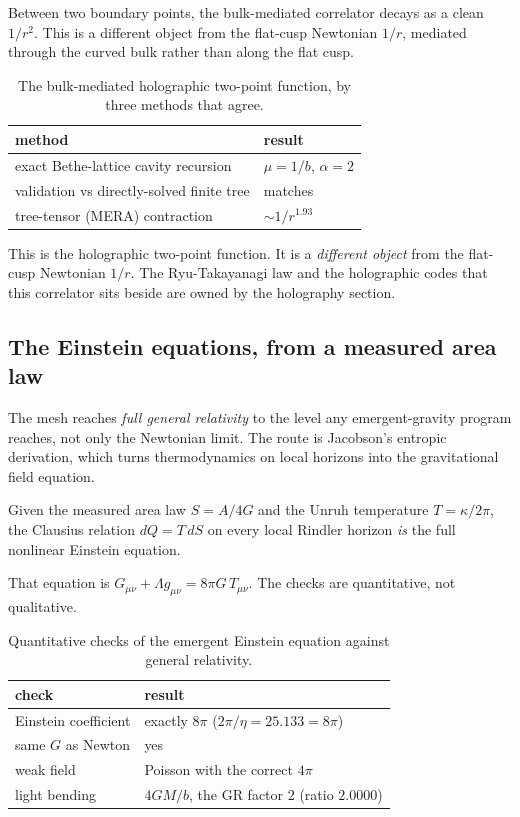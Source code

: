 Between two boundary points, the bulk-mediated correlator decays as a clean $1/r^2$. This is a different object from the flat-cusp Newtonian $1/r$, mediated through the curved bulk rather than along the flat cusp.

\begin{table}[ht]
\centering
\begin{tabular}{@{}ll@{}}
\toprule
method & result \\
\midrule
exact Bethe-lattice cavity recursion & $\mu = 1/b$, $\alpha = 2$ \\
validation vs directly-solved finite tree & matches \\
tree-tensor (MERA) contraction & $\sim 1/r^{1.93}$ \\
\bottomrule
\end{tabular}
\caption{The bulk-mediated holographic two-point function, by three methods that agree.}
\label{tab:holo-correlator}
\end{table}

This is the holographic two-point function. It is a \emph{different object} from the flat-cusp Newtonian $1/r$. The Ryu-Takayanagi law and the holographic codes that this correlator sits beside are owned by the holography section.

\subsection{The Einstein equations, from a measured area law}

The mesh reaches \emph{full general relativity} to the level any emergent-gravity program reaches, not only the Newtonian limit. The route is Jacobson's entropic derivation, which turns thermodynamics on local horizons into the gravitational field equation.

\begin{principle}
Given the measured area law $S = A/4G$ and the Unruh temperature $T = \kappa/2\pi$, the Clausius relation $dQ = T\,dS$ on every local Rindler horizon \emph{is} the full nonlinear Einstein equation.
\end{principle}

That equation is $G_{\mu\nu} + \Lambda g_{\mu\nu} = 8\pi G\, T_{\mu\nu}$. The checks are quantitative, not qualitative.

\begin{table}[ht]
\centering
\begin{tabular}{@{}ll@{}}
\toprule
check & result \\
\midrule
Einstein coefficient & exactly $8\pi$ ($2\pi/\eta = 25.133 = 8\pi$) \\
same $G$ as Newton & yes \\
weak field & Poisson with the correct $4\pi$ \\
light bending & $4GM/b$, the GR factor $2$ (ratio $2.0000$) \\
\bottomrule
\end{tabular}
\caption{Quantitative checks of the emergent Einstein equation against general relativity.}
\label{tab:einstein-checks}
\end{table}

